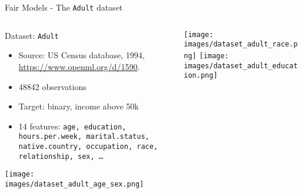\begin{frame}{Fair Models - The \texttt{Adult} dataset}
\begin{columns}
\begin{column}{0.4\textwidth}
Dataset: \texttt{Adult}
\begin{itemize}
  \footnotesize
  \item  Source: US Census database, 1994, \url{https://www.openml.org/d/1590}.
  \item 48842 observations
  \item Target: binary, income above 50k
  \item 14 features: \texttt{age, education, hours.per.week, marital.status, native.country, occupation, race, relationship, sex, \ldots}
\end{itemize}
\texttt{[image: images/dataset\_adult\_age\_sex.png]}
\end{column}%
\begin{column}{0.6\textwidth}

\texttt{[image: images/dataset\_adult\_race.png]}%
\texttt{[image: images/dataset\_adult\_education.png]}
\end{column}
\end{columns}


\end{frame}

